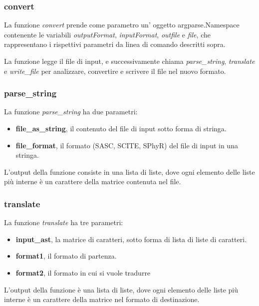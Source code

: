 \subsubsection{convert}
La funzione \textit{convert} prende come parametro un' oggetto argparse.Namespace contenente le variabili \textit{outputFormat}, \textit{inputFormat}, \textit{outfile} e \textit{file}, che rappresentano i rispettivi parametri da linea di comando descritti sopra.

La funzione legge il file di input, e successivamente chiama \textit{parse\_string}, \textit{translate} e \textit{write\_file} per analizzare, convertire e scrivere il file nel nuovo formato. 
\subsubsection{parse\_string}
La funzione \textit{parse\_string} ha due parametri:
\begin{itemize}
\item \textbf{file\_as\_string}, il contenuto del file di input sotto forma di stringa.
\item \textbf{file\_format}, il formato (SASC, SCITE, SPhyR) del file di input in una stringa.
\end{itemize}
L'output della funzione consiste in una lista di liste, dove ogni elemento delle liste più interne è un carattere della matrice contenuta nel file. 
\subsubsection{translate}
La funzione \textit{translate} ha tre parametri:
\begin{itemize}
\item \textbf{input\_ast}, la matrice di caratteri, sotto forma di lista di liste di caratteri. 
\item \textbf{format1}, il formato di partenza.
\item \textbf{format2}, il formato in cui si vuole tradurre
\end{itemize}
L'output della funzione è una lista di liste, dove ogni elemento delle liste più interne è un carattere della matrice nel formato di destinazione. 

